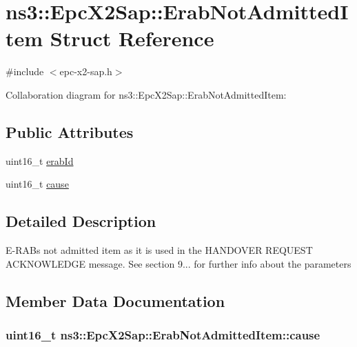 \hypertarget{structns3_1_1EpcX2Sap_1_1ErabNotAdmittedItem}{}\section{ns3\+:\+:Epc\+X2\+Sap\+:\+:Erab\+Not\+Admitted\+Item Struct Reference}
\label{structns3_1_1EpcX2Sap_1_1ErabNotAdmittedItem}


{\ttfamily \#include $<$epc-\/x2-\/sap.\+h$>$}



Collaboration diagram for ns3\+:\+:Epc\+X2\+Sap\+:\+:Erab\+Not\+Admitted\+Item\+:
\subsection*{Public Attributes}
\begin{DoxyCompactItemize}
\item 
uint16\+\_\+t \hyperlink{structns3_1_1EpcX2Sap_1_1ErabNotAdmittedItem_afebdd8007d65b39398445a4c4367e91f}{erab\+Id}
\item 
uint16\+\_\+t \hyperlink{structns3_1_1EpcX2Sap_1_1ErabNotAdmittedItem_a06731f1a19bada25d8ebf75a26099131}{cause}
\end{DoxyCompactItemize}


\subsection{Detailed Description}
E-\/\+R\+A\+Bs not admitted item as it is used in the H\+A\+N\+D\+O\+V\+ER R\+E\+Q\+U\+E\+ST A\+C\+K\+N\+O\+W\+L\+E\+D\+GE message. See section 9... for further info about the parameters 

\subsection{Member Data Documentation}
\subsubsection[{\texorpdfstring{cause}{cause}}]{\setlength{\rightskip}{0pt plus 5cm}uint16\+\_\+t ns3\+::\+Epc\+X2\+Sap\+::\+Erab\+Not\+Admitted\+Item\+::cause}\hypertarget{structns3_1_1EpcX2Sap_1_1ErabNotAdmittedItem_a06731f1a19bada25d8ebf75a26099131}{}\label{structns3_1_1EpcX2Sap_1_1ErabNotAdmittedItem_a06731f1a19bada25d8ebf75a26099131}
